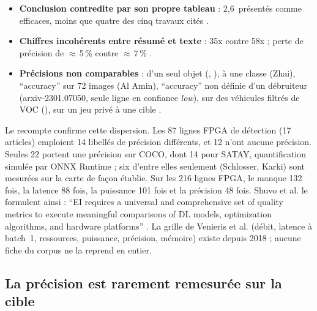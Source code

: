 \begin{itemize}
    383 fois qui mêlent une estimation FPGA et des mesures CPU et GPU
    \citep[Table~VII]{arxiv-2604.21280-imagehd-energy-efficient-device-continual}.
  \item \textbf{Conclusion contredite par son propre tableau} : 2,6\, présentés comme
    efficaces, moins que quatre des cinq travaux cités
    \citep[§IV-B, Table~I]{arxiv-2507.18174-real-time-object-detection-classification}.
  \item \textbf{Chiffres incohérents entre résumé et texte} : 35x contre 58x
    \citep[§I-B, §IV-C]{arxiv-2402.09780-tinycl-efficient-hardware-architecture-continual}\pp ;
    perte de précision de $\approx$\,5\,\% contre $\approx$\,7\,\%
    \citep[Résumé, §IV-B]{arxiv-2607.13106-no-attention-no-problem-dpu}\pp.
  \item \textbf{Précisions non comparables} :  d'un seul objet (, \pp), 
    à une classe (Zhai), \enquote{accuracy} sur 72 images (Al Amin), \enquote{accuracy}
    non définie d'un débruiteur (arxiv-2301.07050\pp, seule ligne en confiance \emph{low}),
     sur des véhicules filtrés de VOC (\pp),  sur un jeu privé à une cible
    \citep[Table~4]{arxiv-2502.15737-performance-analysis-you-only-look}.
\end{itemize}
Le recompte confirme cette dispersion. Les 87 lignes FPGA de détection (17 articles)
emploient 14 libellés de précision différents, et 12 n'ont aucune précision. Seules 22
portent une précision sur COCO, dont 14 pour SATAY, quantification simulée par ONNX
Runtime ; six d'entre elles seulement (Schlosser, Karki\pp) sont mesurées sur la carte de
façon établie. Sur les 216 lignes FPGA, le  manque 132 fois, la latence 88 fois, la
puissance 101 fois et la précision 48 fois. Shuvo et al. le formulent ainsi : \enquote{EI requires a universal and
comprehensive set of quality metrics to execute meaningful comparisons of DL models,
optimization algorithms, and hardware platforms} . La grille de Venieris et al.
(débit, latence à batch~1, ressources, puissance, précision, mémoire) existe depuis 2018 ;
aucune fiche du corpus ne la reprend en entier.

\subsection{La précision est rarement remesurée sur la cible}

